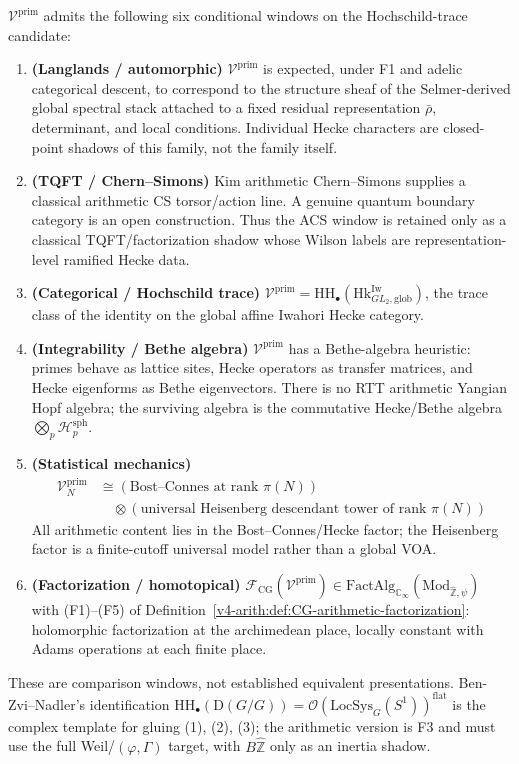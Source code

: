 \begin{conjecture}
\label{v4-arith:thm:six-window-placement}
\(\mathcal{V}^{\mathrm{prim}}\) admits the
following six conditional windows on the Hochschild-trace candidate:
\begin{enumerate}
\item \textbf{(Langlands / automorphic)}
\(\mathcal{V}^{\mathrm{prim}}\) is expected, under F1 and adelic
categorical descent, to correspond to the structure sheaf of the
Selmer-derived global spectral stack attached to a fixed residual
representation \(\bar\rho\), determinant, and local conditions.
Individual Hecke characters are closed-point shadows of this family,
not the family itself.
\item \textbf{(TQFT / Chern--Simons)}
Kim arithmetic Chern--Simons supplies a classical arithmetic CS
torsor/action line. A genuine quantum boundary category is an open
construction. Thus the ACS window is retained only as a classical
TQFT/factorization shadow whose Wilson labels are representation-level
ramified Hecke data.
\item \textbf{(Categorical / Hochschild trace)}
\(\mathcal{V}^{\mathrm{prim}}=\mathrm{HH}_{\bullet}(\mathrm{Hk}^{\mathrm{Iw}}_{GL_{2},\mathrm{glob}})\),
the trace class of the identity on the global affine Iwahori
Hecke category.
\item \textbf{(Integrability / Bethe algebra)}
\(\mathcal{V}^{\mathrm{prim}}\) has a Bethe-algebra heuristic:
primes behave as lattice sites, Hecke operators as transfer
matrices, and Hecke eigenforms as Bethe eigenvectors. There is no
RTT arithmetic Yangian Hopf algebra; the surviving algebra is the
commutative Hecke/Bethe algebra \(\bigotimes_{p}\mathcal{H}_{p}^{\mathrm{sph}}\).
\item \textbf{(Statistical mechanics)}
\[
\begin{aligned}
\mathcal{V}^{\mathrm{prim}}_{N}&\cong(\text{Bost--Connes at rank }\pi(N))\\
&\quad\otimes(\text{universal Heisenberg descendant tower of rank }\pi(N))
\end{aligned}
\]
All arithmetic content lies in the Bost--Connes/Hecke factor; the
Heisenberg factor is a finite-cutoff universal model rather than a
global VOA.
\item \textbf{(Factorization / homotopical)}
\(\mathcal{F}_{\mathrm{CG}}(\mathcal{V}^{\mathrm{prim}})
\in\mathrm{FactAlg}_{\mathbb{C}_{\infty}}(\mathrm{Mod}_{\widehat{\mathbb{Z}},\psi})\)
with (F1)--(F5) of Definition~\ref{v4-arith:def:CG-arithmetic-factorization}:
holomorphic factorization at the archimedean place, locally
constant with Adams operations at each finite place.
\end{enumerate}
These are comparison windows, not established equivalent
presentations. Ben-Zvi--Nadler's identification
\(\mathrm{HH}_{\bullet}(\mathrm{D}(G/G))=\mathcal{O}(\mathrm{LocSys}_{G}(S^{1}))^{\mathrm{flat}}\)
is the complex template for gluing (1), (2), (3); the arithmetic
version is F3 and must use the full Weil/\((\varphi,\Gamma)\) target,
with \(B\widehat{\mathbb{Z}}\) only as an inertia shadow.
\end{conjecture}

